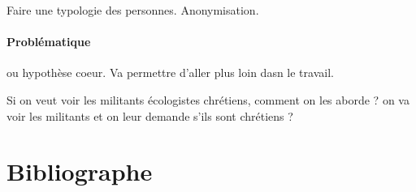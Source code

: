 Faire une typologie des personnes. Anonymisation. 


\paragraph{Problématique} ou hypothèse coeur. Va permettre d'aller plus loin dasn le travail. 

\begin{Ex}
Si on veut voir les militants écologistes chrétiens, comment on les aborde ? on va voir les militants et on leur demande s'ils sont chrétiens ?

\end{Ex}




\section{Bibliographe}

